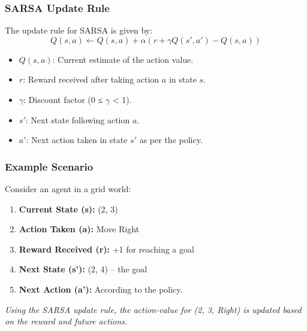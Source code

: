 \documentclass[aspectratio=169]{beamer}
\begin{document}
\begin{frame}[fragile]
    \frametitle{SARSA Update Rule}
    The update rule for SARSA is given by:
    \begin{equation}
        Q(s, a) \leftarrow Q(s, a) + \alpha \left( r + \gamma Q(s', a') - Q(s, a) \right)
    \end{equation}
    \begin{itemize}
        \item \( Q(s, a) \): Current estimate of the action value.
        \item \( r \): Reward received after taking action \( a \) in state \( s \).
        \item \( \gamma \): Discount factor (0 ≤ \( \gamma \) < 1).
        \item \( s' \): Next state following action \( a \).
        \item \( a' \): Next action taken in state \( s' \) as per the policy.
    \end{itemize}
\end{frame}

\begin{frame}[fragile]
    \frametitle{Example Scenario}
    Consider an agent in a grid world:
    \begin{enumerate}
        \item \textbf{Current State (s):} (2, 3)
        \item \textbf{Action Taken (a):} Move Right
        \item \textbf{Reward Received (r):} +1 for reaching a goal
        \item \textbf{Next State (s'):} (2, 4) – the goal
        \item \textbf{Next Action (a'):} According to the policy.
    \end{enumerate}
    
    \textit{Using the SARSA update rule, the action-value for (2, 3, Right) is updated based on the reward and future actions.}
\end{frame}
\end{document}
